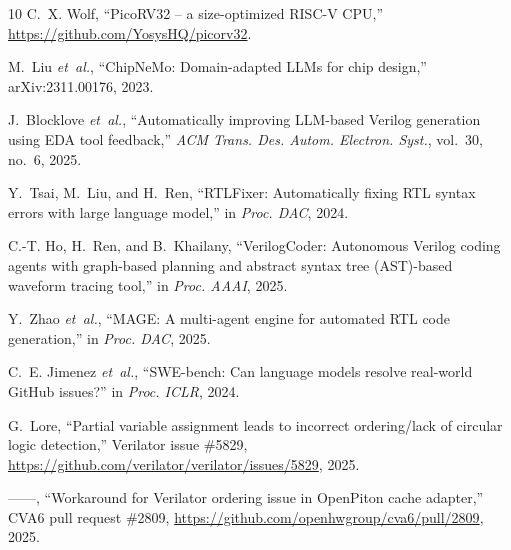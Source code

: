 \documentclass[10pt,conference,compsoc]{IEEEtran}
\begin{document}
\begin{thebibliography}{10}
C.~X. Wolf, ``{PicoRV32} -- a size-optimized {RISC-V} {CPU},'' \url{https://github.com/YosysHQ/picorv32}.

M.~Liu \emph{et~al.}, ``{ChipNeMo}: Domain-adapted {LLMs} for chip design,'' arXiv:2311.00176, 2023.

J.~Blocklove \emph{et~al.}, ``Automatically improving {LLM}-based {Verilog} generation using {EDA} tool feedback,'' \emph{ACM Trans. Des. Autom. Electron. Syst.}, vol.~30, no.~6, 2025.

Y.~Tsai, M.~Liu, and H.~Ren, ``{RTLFixer}: Automatically fixing {RTL} syntax errors with large language model,'' in \emph{Proc. DAC}, 2024.

C.-T. Ho, H.~Ren, and B.~Khailany, ``{VerilogCoder}: Autonomous {Verilog} coding agents with graph-based planning and abstract syntax tree ({AST})-based waveform tracing tool,'' in \emph{Proc. AAAI}, 2025.

Y.~Zhao \emph{et~al.}, ``{MAGE}: A multi-agent engine for automated {RTL} code generation,'' in \emph{Proc. DAC}, 2025.

C.~E. Jimenez \emph{et~al.}, ``{SWE-bench}: Can language models resolve real-world {GitHub} issues?'' in \emph{Proc. ICLR}, 2024.

G.~Lore, ``Partial variable assignment leads to incorrect ordering/lack of circular logic detection,'' Verilator issue \#5829, \url{https://github.com/verilator/verilator/issues/5829}, 2025.

------, ``Workaround for {Verilator} ordering issue in {OpenPiton} cache adapter,'' CVA6 pull request \#2809, \url{https://github.com/openhwgroup/cva6/pull/2809}, 2025.

\end{thebibliography}
\end{document}
